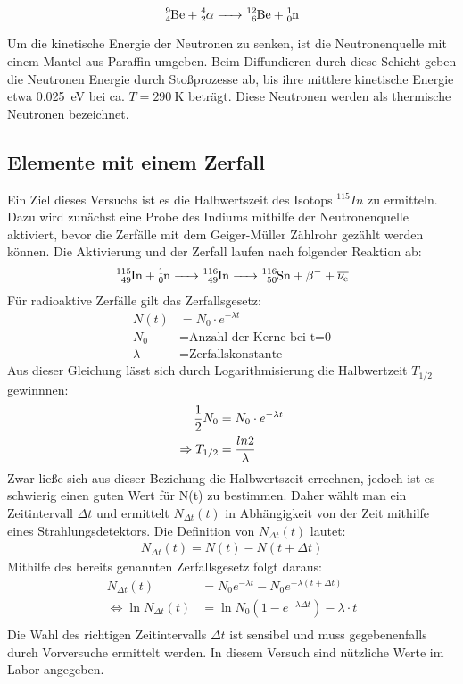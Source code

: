 \begin{equation*}
	\ce{_4^9Be + _2^4\alpha}\ce{->} \ce{_6^{12}Be +_0^1n} 
\end{equation*}

Um die kinetische Energie der Neutronen zu senken, ist die Neutronenquelle mit einem Mantel aus Paraffin umgeben. Beim Diffundieren durch diese Schicht geben die Neutronen Energie durch Stoßprozesse ab, bis ihre mittlere kinetische Energie etwa \SI{0.025}{\eV} bei ca. $T= \SI{290}{\kelvin}$ beträgt. Diese Neutronen werden als thermische Neutronen bezeichnet.


\subsection{Elemente mit einem Zerfall}

Ein Ziel dieses Versuchs ist es die Halbwertszeit des Isotops $^{115}In$ zu ermitteln. Dazu wird zunächst eine Probe des Indiums mithilfe der Neutronenquelle aktiviert, bevor die Zerfälle mit dem Geiger-Müller Zählrohr gezählt werden können. Die Aktivierung und der Zerfall laufen nach folgender Reaktion ab:
\begin{align*}
\ce{_{49}^{115}In + _0^1n} \ce{->} \ce{_{49}^{116}In -> _{50}^{116}Sn + \beta^- +\overline{\nu_e}}
\end{align*}
Für radioaktive Zerfälle gilt das Zerfallsgesetz:
\begin{align*}
N(t)&=N_0\cdot e^{-\lambda t}\\
N_0&=\text{Anzahl der Kerne bei t=0}\\
\lambda&=\text{Zerfallskonstante}
\end{align*}
Aus dieser Gleichung lässt sich durch Logarithmisierung die Halbwertzeit $T_{1/2}$ gewinnnen:
\begin{align}
\notag
\frac{1}{2}N_0&=N_0\cdot e^{-\lambda t}\\
\Rightarrow T_{1/2}&=\frac{ln2}{\lambda}
\label{eq:Theorie_Halbwertszeit}
\end{align}
Zwar ließe sich aus dieser Beziehung die Halbwertszeit errechnen, jedoch ist es schwierig einen guten Wert für N(t) zu bestimmen. Daher wählt man ein Zeitintervall $\Delta t$ und ermittelt $N_{\Delta t}(t)$ in Abhängigkeit von der Zeit mithilfe eines Strahlungsdetektors. Die Definition von $N_{\Delta t}(t)$ lautet:
\begin{align*}
N_{\Delta t}(t)=N(t)-N(t+\Delta t)
\end{align*}
Mithilfe des bereits genannten Zerfallsgesetz folgt daraus:
\begin{align*}
N_{\Delta t}(t)&=N_0e^{-\lambda t}-N_0e^{-\lambda(t+\Delta t)}\\
\Longleftrightarrow \ln N_{\Delta t}(t)&=\ln N_0(1-e^{-\lambda \Delta t})-\lambda\cdot t\\
\end{align*}
Die Wahl des richtigen Zeitintervalls $\Delta t$ ist sensibel und muss gegebenenfalls durch Vorversuche ermittelt werden. In diesem Versuch sind nützliche Werte im Labor angegeben. 



